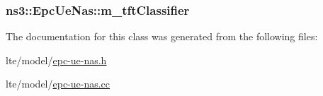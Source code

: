 \subsubsection[{\texorpdfstring{m\+\_\+tft\+Classifier}{m_tftClassifier}}]{ ns3\+::\+Epc\+Ue\+Nas\+::m\+\_\+tft\+Classifier\hspace{0.3cm}{\ttfamily [private]}}\hypertarget{classns3_1_1EpcUeNas_aad557b717272071b34807e2af0bd9364}{}\label{classns3_1_1EpcUeNas_aad557b717272071b34807e2af0bd9364}


The documentation for this class was generated from the following files\+:\begin{DoxyCompactItemize}
\item 
lte/model/\hyperlink{epc-ue-nas_8h}{epc-\/ue-\/nas.\+h}\item 
lte/model/\hyperlink{epc-ue-nas_8cc}{epc-\/ue-\/nas.\+cc}\end{DoxyCompactItemize}
